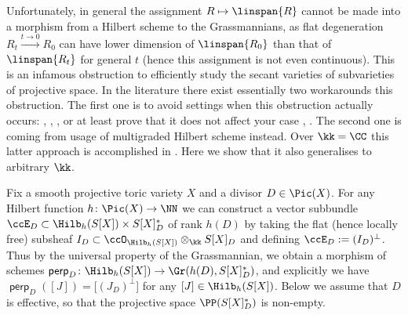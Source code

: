 \documentclass[12pt,a4paper]{article}
\DeclareMathOperator{\perpmap}{\mathsf {perp}}
\begin{document}
Unfortunately, in general the assignment $R\mapsto \linspan{R}$ cannot be made into a morphism from a Hilbert scheme to the Grassmannians, as flat degeneration $R_t \stackrel{t\to 0}{\longrightarrow} R_0$ can have lower dimension of $\linspan{R_0}$ than that of  $\linspan{R_t}$ for general $t$ (hence this assignment is not even continuous).
This is an infamous obstruction to efficiently study the secant varieties of subvarieties of projective space.
In the literature there exist essentially two workarounds this obstruction.
The first one is to avoid settings when this obstruction actually  occurs: \cite{nisiabu_jabu_cactus}, \cite{nisiabu_jabu_farnik_cactus_Fujita}, \cite{choi_lacini_park_sheridan_sings_and_syz_of_secant_vars}, or at least prove that it does not affect your case \cite[Prop.~3.1]{ranestad_voisin_VSP_and_divisors_in_the_moduli_of_cubic_fourfolds}, \cite[Thm~9.2, Rem.~9.3]{jelisiejew_landsberg_pal_concise_tensors_of_minimal_border_rank}.
The second one is coming from usage of multigraded Hilbert scheme instead.
Over $\kk=\CC$ this latter approach is accomplished in  \cite{nisiabu_jabu_border_apolarity}.
Here we show that it also generalises to arbitrary $\kk$.

Fix a smooth projective toric variety $X$ and a  divisor $D\in \Pic(X)$.
For any Hilbert function $h \colon \Pic(X) \to \NN$ we can construct a vector subbundle $\ccE_{D} \subset \Hilb_h(S[X]) \times S[X]_D^*$ of rank $h(D)$
by taking the flat (hence locally free) subsheaf $I_{D}\subset \ccO_{\Hilb_h(S[X])} \otimes_{\kk} S[X]_D$ and defining $\ccE_{D}:= (I_{D})^{\perp}$.
Thus by the universal property of the Grassmannian, we obtain a morphism of schemes
$\perpmap_D \colon  \Hilb_h(S[X]) \to  \Gr(h(D), S[X]_D^*)$, and explicitly we have $\perpmap_{D}([J]) = [(J_D)^{\perp}$] for any $[J]\in \Hilb_h(S[X])$.
Below we assume that $D$ is effective, so that the projective space $\PP(S[X]_D^*)$ is non-empty.
\end{document}
